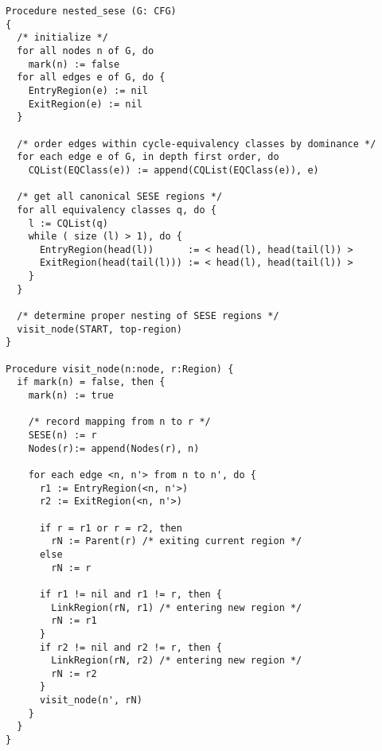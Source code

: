 \begin{verbatim}
Procedure nested_sese (G: CFG)
{
  /* initialize */
  for all nodes n of G, do
    mark(n) := false
  for all edges e of G, do {
    EntryRegion(e) := nil
    ExitRegion(e) := nil
  }

  /* order edges within cycle-equivalency classes by dominance */
  for each edge e of G, in depth first order, do
    CQList(EQClass(e)) := append(CQList(EQClass(e)), e)

  /* get all canonical SESE regions */
  for all equivalency classes q, do {
    l := CQList(q)
    while ( size (l) > 1), do {
      EntryRegion(head(l))      := < head(l), head(tail(l)) >
      ExitRegion(head(tail(l))) := < head(l), head(tail(l)) >
    }
  }

  /* determine proper nesting of SESE regions */
  visit_node(START, top-region)
}

Procedure visit_node(n:node, r:Region) {
  if mark(n) = false, then {
    mark(n) := true

    /* record mapping from n to r */
    SESE(n) := r
    Nodes(r):= append(Nodes(r), n)

    for each edge <n, n'> from n to n', do {
      r1 := EntryRegion(<n, n'>)
      r2 := ExitRegion(<n, n'>)

      if r = r1 or r = r2, then
        rN := Parent(r) /* exiting current region */
      else
        rN := r

      if r1 != nil and r1 != r, then {
        LinkRegion(rN, r1) /* entering new region */
        rN := r1
      }
      if r2 != nil and r2 != r, then {
        LinkRegion(rN, r2) /* entering new region */
        rN := r2
      }
      visit_node(n', rN)
    }
  }
}
\end{verbatim}
